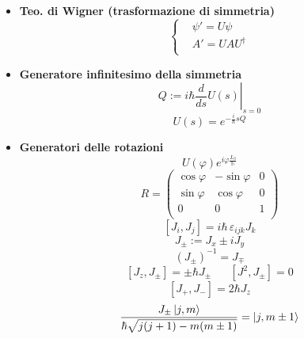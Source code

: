 \documentclass{article}
\DeclarePairedDelimiter\ket{\lvert}{\rangle}
\begin{document}
\begin{small}
\begin{multicols*}{3}
\begin{itemize}[leftmargin=*]
	\item \textbf{Teo. di Wigner (trasformazione di simmetria)}
		\[
			\left\{\begin{aligned}
				&\psi ' = U\psi \\
				&A' = UAU^\dag \\
			\end{aligned}\right.
		\]
	\item \textbf{Generatore infinitesimo della simmetria}
		\[Q:= \left.i\hbar \frac{d}{ds}U(s)\right|_{s=0}\]
		\[U(s) = e^{-\frac{i}{\hbar }sQ}\]
	\item \textbf{Generatori delle rotazioni}
		\[U(\varphi ) e^{i\varphi \frac{L_3}{\mathbb{h}}}\]
		\[R=\begin{pmatrix}
			\cos\varphi & -\sin\varphi &0\\
			\sin\varphi &\cos\varphi & 0\\
			0&0&1\\
		\end{pmatrix}\]
		\[\left[J_i, J_j\right] = i\hbar\, \varepsilon _{ijk} J_k\]
		\[J_\pm := J_x \pm iJ_y\]
		\[\left(J_\pm\right)^{-1} = J_\mp\]
		\[\left[J_z,J_\pm\right] = \pm\hbar J_\pm \hspace{20pt} \left[J^2,J_\pm\right] = 0\]
		\[\left[J_+, J_-\right] = 2\hbar J_z\]
		\[\frac{J_\pm \, \ket*{j,m}}{\hbar \sqrt{j(j+1) - m(m\pm 1)}} = \ket*{j,m\pm 1}\]


\end{itemize}
\end{multicols*}
\end{small}
\end{document}
